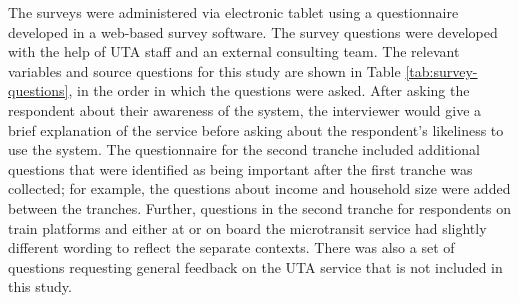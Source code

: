 \documentclass[smartcities,article,submit,moreauthors,pdftex]{Definitions/mdpi}
\begin{document}
The surveys were administered via electronic tablet using a questionnaire developed in a web-based survey software. The survey questions were developed with the help of UTA staff and an external consulting team. The relevant variables and source questions for this study are shown in Table \ref{tab:survey-questions}, in the order in which the questions were asked. After asking the respondent about their awareness of the system, the interviewer would give a brief explanation of the service before asking about the respondent’s likeliness to use the system. The questionnaire for the second tranche included additional questions that were identified as being important after the first tranche was collected; for example, the questions about income and household size were added between the tranches. Further, questions in the second tranche for respondents on train platforms and either at or on board the microtransit service had slightly different wording to reflect the separate contexts. There was also a set of questions requesting general feedback on the UTA service that is not included in this study.
\end{document}
